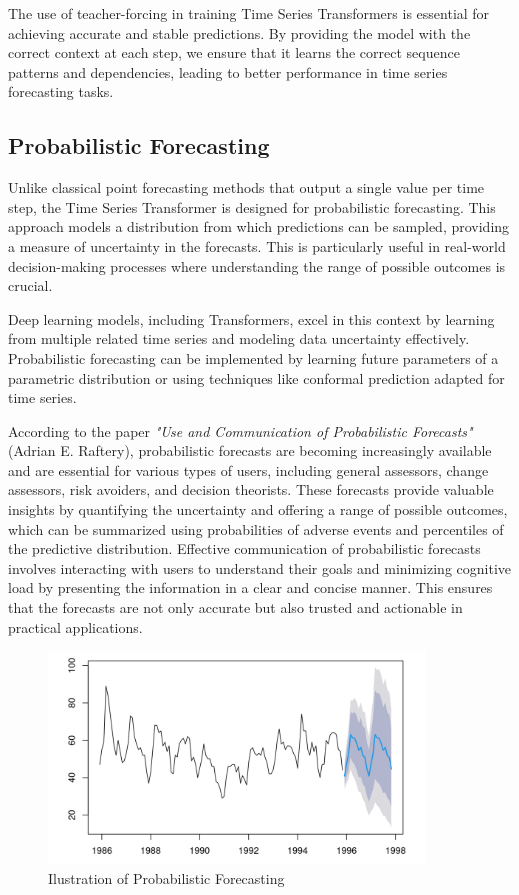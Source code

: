 The use of teacher-forcing in training Time Series Transformers is essential for achieving accurate and stable predictions. By providing the model with the correct context at each step, we ensure that it learns the correct sequence patterns and dependencies, leading to better performance in time series forecasting tasks.


\subsection{Probabilistic Forecasting}
Unlike classical point forecasting methods that output a single value per time step, the Time Series Transformer is designed for probabilistic forecasting. This approach models a distribution from which predictions can be sampled, providing a measure of uncertainty in the forecasts. This is particularly useful in real-world decision-making processes where understanding the range of possible outcomes is crucial.

Deep learning models, including Transformers, excel in this context by learning from multiple related time series and modeling data uncertainty effectively. Probabilistic forecasting can be implemented by learning future parameters of a parametric distribution or using techniques like conformal prediction adapted for time series.

According to the paper \textit{"Use and Communication of Probabilistic Forecasts"} (Adrian E. Raftery)\cite{raftery2014usecommunicationprobabilisticforecasts}, probabilistic forecasts are becoming increasingly available and are essential for various types of users, including general assessors, change assessors, risk avoiders, and decision theorists. These forecasts provide valuable insights by quantifying the uncertainty and offering a range of possible outcomes, which can be summarized using probabilities of adverse events and percentiles of the predictive distribution. Effective communication of probabilistic forecasts involves interacting with users to understand their goals and minimizing cognitive load by presenting the information in a clear and concise manner. This ensures that the forecasts are not only accurate but also trusted and actionable in practical applications.

\begin{figure}[htbp]
    \centering
    \includegraphics[width=10cm]{3_ChapterTranformerVariants/figuras/Probabilistic.png}
    \caption{Ilustration of Probabilistic Forecasting\cite{hyndman2014visualization}}
    \end{figure}





